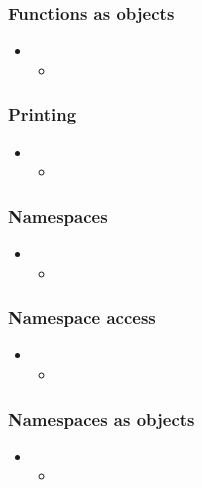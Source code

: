 \begin{frame}[fragile]
%
  \frametitle{Functions as objects}
%
  \begin{itemize}
%
  \item 
    \begin{itemize}
    \item
    \end{itemize}
%
  \end{itemize}
%
\end{frame}

\begin{frame}[fragile]
%
  \frametitle{Printing}
%
  \begin{itemize}
%
  \item 
    \begin{itemize}
    \item
    \end{itemize}
%
  \end{itemize}
%
\end{frame}

\begin{frame}[fragile]
%
  \frametitle{Namespaces}
%
  \begin{itemize}
%
  \item 
    \begin{itemize}
    \item
    \end{itemize}
%
  \end{itemize}
%
\end{frame}

\begin{frame}[fragile]
%
  \frametitle{Namespace access}
%
  \begin{itemize}
%
  \item 
    \begin{itemize}
    \item
    \end{itemize}
%
  \end{itemize}
%
\end{frame}

\begin{frame}[fragile]
%
  \frametitle{Namespaces as objects}
%
  \begin{itemize}
%
  \item 
    \begin{itemize}
    \item
    \end{itemize}
%
  \end{itemize}
%
\end{frame}

